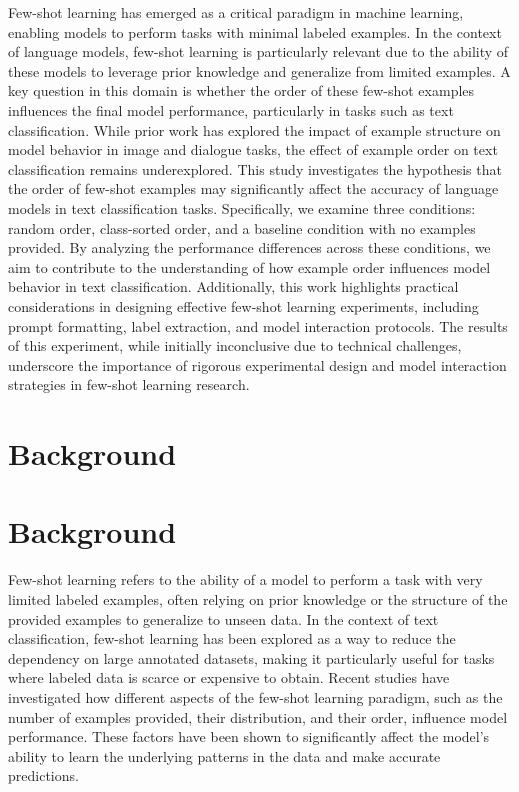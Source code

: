 \documentclass{article}
\begin{document}
Few-shot learning has emerged as a critical paradigm in machine learning, enabling models to perform tasks with minimal labeled examples. In the context of language models, few-shot learning is particularly relevant due to the ability of these models to leverage prior knowledge and generalize from limited examples. A key question in this domain is whether the order of these few-shot examples influences the final model performance, particularly in tasks such as text classification. While prior work has explored the impact of example structure on model behavior in image and dialogue tasks, the effect of example order on text classification remains underexplored. This study investigates the hypothesis that the order of few-shot examples may significantly affect the accuracy of language models in text classification tasks. Specifically, we examine three conditions: random order, class-sorted order, and a baseline condition with no examples provided. By analyzing the performance differences across these conditions, we aim to contribute to the understanding of how example order influences model behavior in text classification. Additionally, this work highlights practical considerations in designing effective few-shot learning experiments, including prompt formatting, label extraction, and model interaction protocols. The results of this experiment, while initially inconclusive due to technical challenges, underscore the importance of rigorous experimental design and model interaction strategies in few-shot learning research.
\section{Background}
\section*{Background}

Few-shot learning refers to the ability of a model to perform a task with very limited labeled examples, often relying on prior knowledge or the structure of the provided examples to generalize to unseen data. In the context of text classification, few-shot learning has been explored as a way to reduce the dependency on large annotated datasets, making it particularly useful for tasks where labeled data is scarce or expensive to obtain. Recent studies have investigated how different aspects of the few-shot learning paradigm, such as the number of examples provided, their distribution, and their order, influence model performance. These factors have been shown to significantly affect the model's ability to learn the underlying patterns in the data and make accurate predictions.
\end{document}

